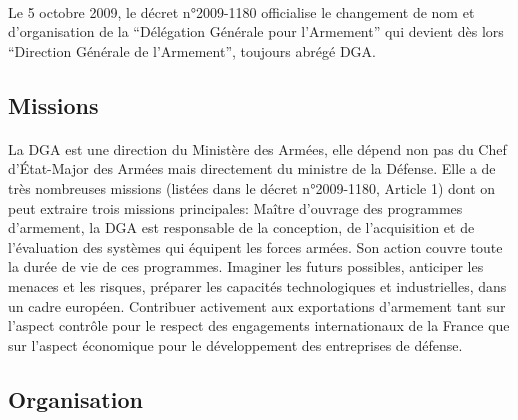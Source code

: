 \documentclass[11pt, book, english, french, standardlists]{upmethodology-document}
\begin{document}
				\paragraph*{}
					Le 5 octobre 2009, le décret n°2009-1180\cite{DEFD0918712D} officialise le changement de nom et d'organisation de la ``Délégation Générale pour l'Armement'' qui devient dès lors ``Direction Générale de l'Armement'', toujours abrégé \gls{DGA}.
			\subsection{Missions}
				\paragraph*{}
					La \gls{DGA} est une direction du Ministère des Armées, elle dépend non pas du Chef d'État-Major des Armées mais directement du ministre de la Défense. Elle a de très nombreuses missions (listées dans le décret n°2009-1180\cite{DEFD0918712D}, Article 1) dont on peut extraire trois missions principales:
					Maître d'ouvrage des programmes d'armement, la \gls{DGA} est responsable de la conception, de l'acquisition et de l'évaluation des systèmes qui équipent les forces armées. Son action couvre toute la durée de vie de ces programmes.
					Imaginer les futurs possibles, anticiper les menaces et les risques, préparer les capacités technologiques et industrielles, dans un cadre européen.
					Contribuer activement aux exportations d'armement tant sur l'aspect contrôle pour le respect des engagements internationaux de la France que sur l'aspect économique pour le développement des entreprises de défense.
			\subsection{Organisation}
\end{document}
